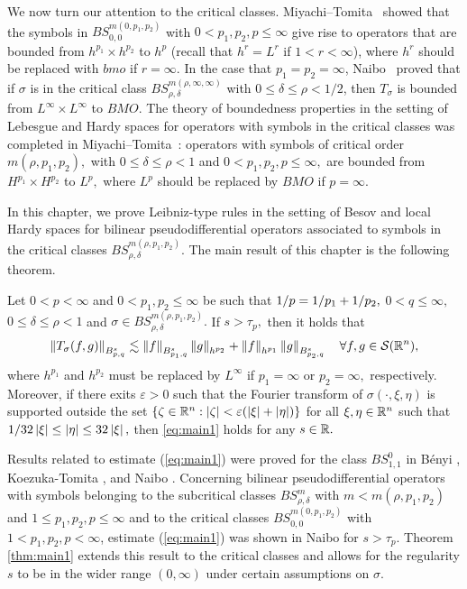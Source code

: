We now turn our attention to the critical classes. Miyachi--Tomita~\cite{MR3179688} showed that the symbols in $BS^{m(0,p_1,p_2)}_{0,0}$ with $0<p_1,p_2,p\le  \infty $ give rise to operators that are bounded from  $h^{p_1}\times h^{p_2}$ to $h^p$ (recall that $h^{r}=L^r$ if $1<r<\infty$), where $h^{r}$ should be replaced with $bmo$ if $r=\infty.$   In the case that $p_1 = p_2 = \infty$, Naibo~\cite{MR3411149}  proved  that if $\sigma$ is in the critical class $BS^{m(\rho, \infty,\infty)}_{\rho,\delta}$ with $0\le \delta\le \rho<1/2$, then $T_\sigma$ is bounded from $L^{\infty}\times L^{\infty}$ to $BMO.$ The theory of boundedness properties in the setting of Lebesgue and  Hardy  spaces for operators with symbols in the critical classes was completed in Miyachi--Tomita~\cite{MT1, MT2}: operators with symbols of critical order $ m(\rho, p_1,p_2),$ with $0\le \delta\le \rho<1$  and $0< p_1,p_2,p\le \infty,$ are bounded from $H^{p_1}\times H^{p_2}$ to $L^p,$ where  $L^p$ should be replaced by $BMO$ if $p=\infty.$

In this chapter, we prove Leibniz-type rules in the setting of Besov and local Hardy spaces for bilinear pseudodifferential operators associated to symbols in the critical classes $BS^{m(\rho,p_1,p_2)}_{\rho,\delta}$. The main result of this chapter is the following theorem.

\begin{theorem} \label{thm:main1}
Let $0<p<\infty$ and  $0<p_1,p_2\le \infty$ be such that $\hcline,$ $0<q\le \infty,$   $0\le\delta\le \rho<1$ and   $\sigma\in BS^{m(\rho,p_1,p_2)}_{\rho,\delta}.$ If $s>\tau_p,$ then it holds that
\begin{equation}\label{eq:main1}
\norm{T_\sigma(f,g)}{\ibes{p}{s}{q}}\lesssim \norm{f}{\ibes{p_1}{s}{q}}\norm{g}{h^{p_2}} +\norm{f}{h^{p_1}}\norm{g}{\ibes{p_2}{s}{q}}\quad \forall f,g\in \sw,
\end{equation}
where $h^{p_1}$ and $h^{p_2}$ must be replaced by $L^\infty$ if $p_1=\infty$ or $p_2=\infty,$ respectively. Moreover,  if there exits $\varepsilon>0$ such that the Fourier transform of  $\sigma(\cdot,\xi,\eta)$ is  supported outside the set  $\{\zeta\in\rn:\abs{\zeta}<\varepsilon (\abs{\xi}+\abs{\eta})\}$ for all  $\xi,\eta\in\rn$ such that $1/32\abs{\xi}\le \abs{\eta}\le 32 \abs{\xi},$ then \eqref{eq:main1} holds for any $s\in\re.$
\end{theorem}

Results related to estimate (\ref{eq:main1}) were proved for the class $BS^0_{1,1}$ in B\'enyi \cite{MR1996120}, Koezuka-Tomita \cite{MR3750316}, and Naibo \citep{MR3393696}. Concerning bilinear pseudodifferential operators with symbols belonging to the subcritical classes $BS^m_{\rho,\delta}$ with $m<m(\rho,p_1,p_2)$ and $1\leq p_1,p_2,p \leq \infty$ and to the critical classes $BS^{m(0,p_1,p_2)}_{0,0}$ with $1<p_1,p_2,p<\infty$, estimate (\ref{eq:main1}) was shown in Naibo \citep[Theorem 1.3]{MR3393696} for $s>\tau_p$. Theorem \ref{thm:main1} extends this result to the critical classes and allows for the regularity $s$ to be in the wider range $(0,\infty)$ under certain assumptions on $\sigma$. 

